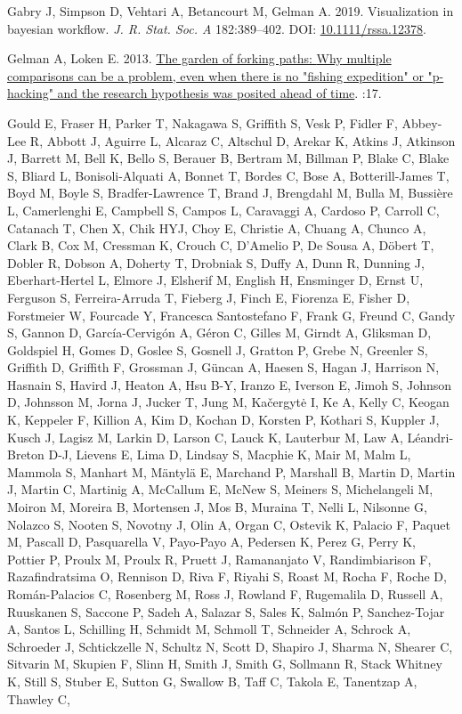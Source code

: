 \documentclass[10pt,a4paper]{article}
\newlength{\cslhangindent}
\newlength{\cslentryspacingunit} %
\newenvironment{CSLReferences}[2] %
 {%
  \setlength{\parindent}{0pt}
  \ifodd #1
  \let\oldpar\par
  \def\par{\hangindent=\cslhangindent\oldpar}
  \fi
  \setlength{\parskip}{#2\cslentryspacingunit}
 }%
 {}
\begin{document}
\begin{CSLReferences}{1}{0}
\leavevmode{}%
Gabry J, Simpson D, Vehtari A, Betancourt M, Gelman A. 2019. Visualization in bayesian workflow. \emph{J. R. Stat. Soc. A} 182:389--402. DOI: \href{https://doi.org/10.1111/rssa.12378}{10.1111/rssa.12378}.

\leavevmode{}%
Gelman A, Loken E. 2013. \href{http://www.stat.columbia.edu/~gelman/research/unpublished/p_hacking.pdf}{The garden of forking paths: {Why} multiple comparisons can be a problem, even when there is no "fishing expedition" or "p-hacking" and the research hypothesis was posited ahead of time}. :17.

\leavevmode{}%
Gould E, Fraser H, Parker T, Nakagawa S, Griffith S, Vesk P, Fidler F, Abbey-Lee R, Abbott J, Aguirre L, Alcaraz C, Altschul D, Arekar K, Atkins J, Atkinson J, Barrett M, Bell K, Bello S, Berauer B, Bertram M, Billman P, Blake C, Blake S, Bliard L, Bonisoli-Alquati A, Bonnet T, Bordes C, Bose A, Botterill-James T, Boyd M, Boyle S, Bradfer-Lawrence T, Brand J, Brengdahl M, Bulla M, Bussière L, Camerlenghi E, Campbell S, Campos L, Caravaggi A, Cardoso P, Carroll C, Catanach T, Chen X, Chik HYJ, Choy E, Christie A, Chuang A, Chunco A, Clark B, Cox M, Cressman K, Crouch C, D'Amelio P, De Sousa A, Döbert T, Dobler R, Dobson A, Doherty T, Drobniak S, Duffy A, Dunn R, Dunning J, Eberhart-Hertel L, Elmore J, Elsherif M, English H, Ensminger D, Ernst U, Ferguson S, Ferreira-Arruda T, Fieberg J, Finch E, Fiorenza E, Fisher D, Forstmeier W, Fourcade Y, Francesca Santostefano F, Frank G, Freund C, Gandy S, Gannon D, García-Cervigón A, Géron C, Gilles M, Girndt A, Gliksman D, Goldspiel H, Gomes D, Goslee S, Gosnell J, Gratton P, Grebe N, Greenler S, Griffith D, Griffith F, Grossman J, Güncan A, Haesen S, Hagan J, Harrison N, Hasnain S, Havird J, Heaton A, Hsu B-Y, Iranzo E, Iverson E, Jimoh S, Johnson D, Johnsson M, Jorna J, Jucker T, Jung M, Kačergytė I, Ke A, Kelly C, Keogan K, Keppeler F, Killion A, Kim D, Kochan D, Korsten P, Kothari S, Kuppler J, Kusch J, Lagisz M, Larkin D, Larson C, Lauck K, Lauterbur M, Law A, Léandri-Breton D-J, Lievens E, Lima D, Lindsay S, Macphie K, Mair M, Malm L, Mammola S, Manhart M, Mäntylä E, Marchand P, Marshall B, Martin D, Martin J, Martin C, Martinig A, McCallum E, McNew S, Meiners S, Michelangeli M, Moiron M, Moreira B, Mortensen J, Mos B, Muraina T, Nelli L, Nilsonne G, Nolazco S, Nooten S, Novotny J, Olin A, Organ C, Ostevik K, Palacio F, Paquet M, Pascall D, Pasquarella V, Payo-Payo A, Pedersen K, Perez G, Perry K, Pottier P, Proulx M, Proulx R, Pruett J, Ramananjato V, Randimbiarison F, Razafindratsima O, Rennison D, Riva F, Riyahi S, Roast M, Rocha F, Roche D, Román-Palacios C, Rosenberg M, Ross J, Rowland F, Rugemalila D, Russell A, Ruuskanen S, Saccone P, Sadeh A, Salazar S, Sales K, Salmón P, Sanchez-Tojar A, Santos L, Schilling H, Schmidt M, Schmoll T, Schneider A, Schrock A, Schroeder J, Schtickzelle N, Schultz N, Scott D, Shapiro J, Sharma N, Shearer C, Sitvarin M, Skupien F, Slinn H, Smith J, Smith G, Sollmann R, Stack Whitney K, Still S, Stuber E, Sutton G, Swallow B, Taff C, Takola E, Tanentzap A, Thawley C, 
\end{CSLReferences}
\end{document}
